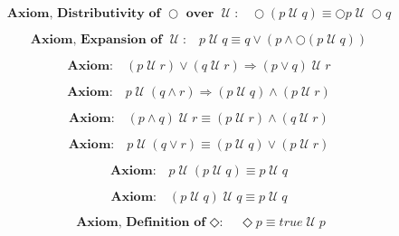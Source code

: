 \documentclass[fleqn, leqno]{article}
\newcommand{\until}{\;\mathcal{U}\;}
\newcommand{\next}{\bigcirc}
\newcommand{\event}{\Diamond}
\newcommand{\spacer}{\vspace{-30pt}}
\begin{document}
\begin{equation}\label{E:distNextUntil}
\textbf{Axiom, Distributivity of $\next$ over $\until$:}\quad \next (p \until q) \equiv \next p \until \next q
\end{equation}

\spacer

\begin{equation}\label{E:expansionUntil}
\textbf{Axiom, Expansion of $\until$:}\quad p \until q \equiv q \lor (p \land \next (p \until q))
\end{equation}

\spacer

\begin{equation}\label{E:untilOrImp}
\textbf{Axiom:}\quad (p \until r) \lor (q \until r) \Rightarrow (p \lor q) \until r
\end{equation}

\spacer

\begin{equation}\label{E:untilAndImp}
\textbf{Axiom:}\quad p \until (q \land r) \Rightarrow (p \until q) \land (p \until r)
\end{equation}

\spacer

\begin{equation}\label{E:untilAndEquiv}
\textbf{Axiom:}\quad (p \land q) \until r \equiv (p \until r) \land (q \until r)
\end{equation}

\spacer

\begin{equation}\label{E:untilOrEquiv}
\textbf{Axiom:}\quad p \until (q \lor r) \equiv (p \until q) \lor (p \until r)
\end{equation}

\spacer

\begin{equation}\label{E:untilIdem}
\textbf{Axiom:}\quad p \until (p \until q) \equiv p \until q
\end{equation}

\spacer

\begin{equation}\label{E:untilIdemR}
\textbf{Axiom:}\quad (p \until q) \until q \equiv p \until q
\end{equation}

\spacer

\begin{equation}\label{E:defEvent}
\textbf{Axiom, Definition of $\event$:}\quad \event p \equiv true \until p
\end{equation}
\end{document}
